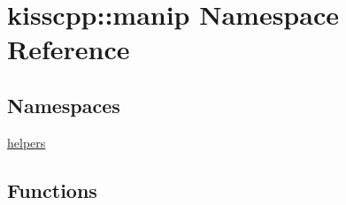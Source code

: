 \hypertarget{namespacekisscpp_1_1manip}{\section{kisscpp\-:\-:manip Namespace Reference}
\label{namespacekisscpp_1_1manip}
}
\subsection*{Namespaces}
\begin{DoxyCompactItemize}
\item 
\hyperlink{namespacekisscpp_1_1manip_1_1helpers}{helpers}
\end{DoxyCompactItemize}
\subsection*{Functions}
